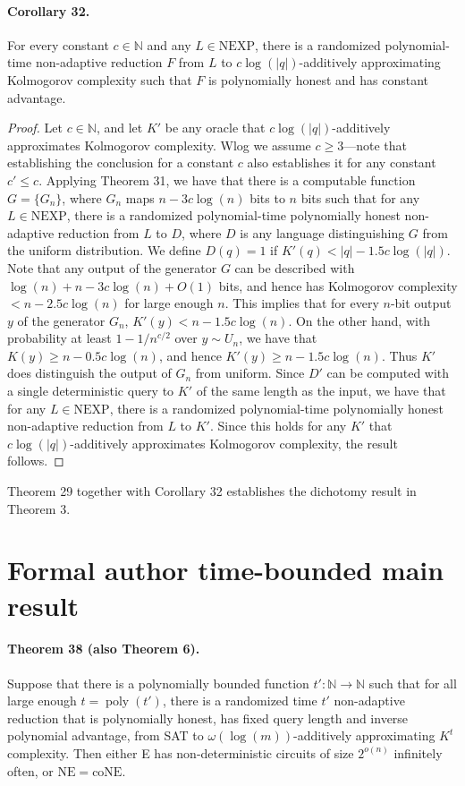 \documentclass[10pt,a4paper]{article}
\begin{document}
\paragraph{Corollary 32.} For every constant $c\in\mathbb N$ and any $L\in\mathrm{NEXP}$, there is a randomized polynomial-time non-adaptive reduction $F$ from $L$ to $c\log(|q|)$-additively approximating Kolmogorov complexity such that $F$ is polynomially honest and has constant advantage.
\begin{proof}Let $c\in\mathbb N$, and let $K'$ be any oracle that $c\log(|q|)$-additively approximates Kolmogorov complexity. Wlog we assume $c\ge3$---note that establishing the conclusion for a constant $c$ also establishes it for any constant $c'\le c$. Applying Theorem 31, we have that there is a computable function $G=\{G_n\}$, where $G_n$ maps $n-3c\log(n)$ bits to $n$ bits such that for any $L\in\mathrm{NEXP}$, there is a randomized polynomial-time polynomially honest non-adaptive reduction from $L$ to $D$, where $D$ is any language distinguishing $G$ from the uniform distribution. We define $D(q)=1$ if $K'(q)<|q|-1.5c\log(|q|)$. Note that any output of the generator $G$ can be described with $\log(n)+n-3c\log(n)+O(1)$ bits, and hence has Kolmogorov complexity $<n-2.5c\log(n)$ for large enough $n$. This implies that for every $n$-bit output $y$ of the generator $G_n$, $K'(y)<n-1.5c\log(n)$. On the other hand, with probability at least $1-1/n^{c/2}$ over $y\sim U_n$, we have that $K(y)\ge n-0.5c\log(n)$, and hence $K'(y)\ge n-1.5c\log(n)$. Thus $K'$ does distinguish the output of $G_n$ from uniform. Since $D'$ can be computed with a single deterministic query to $K'$ of the same length as the input, we have that for any $L\in\mathrm{NEXP}$, there is a randomized polynomial-time polynomially honest non-adaptive reduction from $L$ to $K'$. Since this holds for any $K'$ that $c\log(|q|)$-additively approximates Kolmogorov complexity, the result follows.\end{proof}
Theorem 29 together with Corollary 32 establishes the dichotomy result in Theorem 3.

\section*{Formal author time-bounded main result}
\paragraph{Theorem 38 (also Theorem 6).} Suppose that there is a polynomially bounded function $t':\mathbb N\to\mathbb N$ such that for all large enough $t=\operatorname{poly}(t')$, there is a randomized time $t'$ non-adaptive reduction that is polynomially honest, has fixed query length and inverse polynomial advantage, from SAT to $\omega(\log(m))$-additively approximating $K^t$ complexity. Then either E has non-deterministic circuits of size $2^{o(n)}$ infinitely often, or $\mathrm{NE}=\mathrm{coNE}$.
\end{document}
